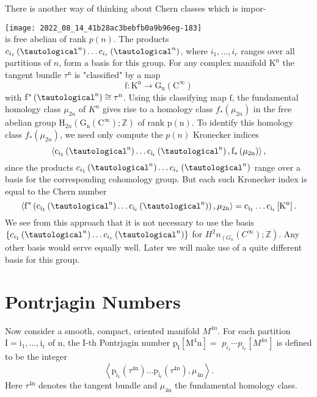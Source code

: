\documentclass[10pt]{article}
\begin{document}
There is another way of thinking about Chern classes which is impor-

\texttt{[image: 2022\_08\_14\_41b28ac3bebfb0a9b96eg-183]}\\
is free abelian of rank $p(n)$. The products $c_{i_{1}}\left(\tautological^{n}\right) \ldots c_{i_{r}}\left(\tautological^{n}\right)$, where $i_{1}, \ldots, i_{r}$ ranges over all partitions of $n$, form a basis for this group. For any complex manifold $\mathrm{K}^{\mathrm{n}}$ the tangent bundle $\tau^{\mathrm{n}}$ is "classified" by a map
$$
\mathrm{f}: \mathrm{K}^{\mathrm{n}} \rightarrow \mathrm{G}_{\mathrm{n}}\left(\mathrm{C}^{\infty}\right)
$$
with $\mathrm{f}^{*}\left(\tautological^{\mathrm{n}}\right) \cong \tau^{\mathrm{n}}$. Using this classifying map $\mathrm{f}$, the fundamental homology class $\mu_{2 n}$ of $K^{n}$ gives rise to a homology class $f_{*}\left(\mu_{2 n}\right)$ in the free abelian group $\mathrm{H}_{2 n}\left(\mathrm{G}_{\mathrm{n}}\left(\mathrm{C}^{\infty}\right) ; \mathbb{Z}\right)$ of rank $\mathrm{p}(\mathrm{n})$. To identify this homology class $f_{*}\left(\mu_{2 n}\right)$, we need only compute the $p(n)$ Kronecker indices
$$
\left\langle\mathrm{c}_{\mathrm{i}_{1}}\left(\tautological^{\mathrm{n}}\right) \ldots \mathrm{c}_{\mathrm{i}_{\mathrm{r}}}\left(\tautological^{\mathrm{n}}\right), \mathrm{f}_{*}\left(\mu_{2 \mathrm{n}}\right)\right\rangle,
$$
since the products $c_{i_{1}}\left(\tautological^{n}\right) \ldots c_{i_{r}}\left(\tautological^{n}\right)$ range over a basis for the corresponding cohomology group. But each such Kronecker index is equal to the Chern number
$$
\left\langle\mathrm{f}^{*}\left(\mathrm{c}_{\mathrm{i}_{1}}\left(\tautological^{\mathrm{n}}\right) \ldots \mathrm{c}_{\mathrm{i}_{\mathrm{r}}}\left(\tautological^{\mathrm{n}}\right)\right), \mu_{2 \mathrm{n}}\right\rangle=\mathrm{c}_{\mathrm{i}_{1}} \ldots \mathrm{c}_{\mathrm{i}_{\mathrm{r}}}\left[\mathrm{K}^{\mathrm{n}}\right] .
$$
We see from this approach that it is not necessary to use the basis $\left\{c_{i_{1}}\left(\tautological^{n}\right) \ldots c_{i_{r}}\left(\tautological^{n}\right)\right\}$ for $\left.H^{2} n_{\left(G_{n}\right.}\left(C^{\infty}\right) ; \mathbb{Z}\right)$. Any other basis would serve equally well. Later we will make use of a quite different basis for this group.

\section{Pontrjagin Numbers}
Now consider a smooth, compact, oriented manifold $M^{4 n}$. For each partition $\mathrm{I}=\mathrm{i}_{1}, \ldots, \mathrm{i}_{\mathrm{r}}$ of $\mathrm{n}$, the I-th Pontrjagin number $\mathrm{p}_{\mathrm{I}}\left[\mathrm{M}^{4} \mathrm{n}\right]=$ $p_{i_{1}} \cdots p_{i_{r}}\left[M^{4 n}\right]$ is defined to be the integer
$$
\left\langle\mathrm{p}_{\mathrm{i}_{1}}\left(\tau^{4 \mathrm{n}}\right) \ldots \mathrm{p}_{\mathrm{i}_{\mathrm{r}}}\left(\tau^{4 \mathrm{n}}\right), \mu_{4 \mathrm{n}}\right\rangle .
$$
Here $\tau^{4 \mathrm{n}}$ denotes the tangent bundle and $\mu_{4 \mathrm{n}}$ the fundamental homology class.
\end{document}
